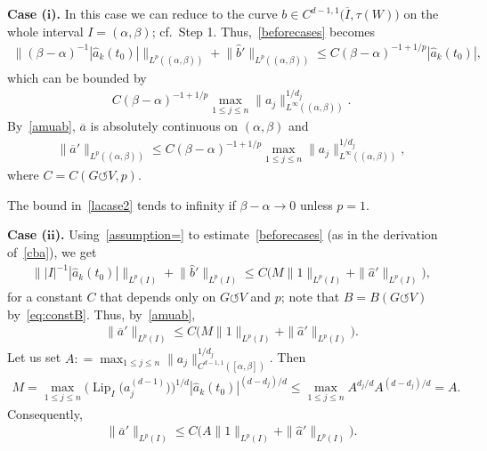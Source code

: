 \documentclass[pdftex]{sigma}
\numberwithin{equation}{section}
\def\al{\alpha}
\def\be{\beta}
\def\ta{\tau}
\def\ol{\overline}
\def\Lip{\on{Lip}}
\def\const{M}
\def\we{\hat}
\def\acts{\circlearrowleft}
\let\on=\operatorname
\begin{document}
\medskip\noindent
{\bf Case ($\boldsymbol i$).}
In this case we can reduce to the curve $b \in C^{d-1,1}\big(\overline I,\ta(W)\big)$ on the whole interval $I=(\al,\be)$; cf.\
Step 1. Thus,~\eqref{beforecases} becomes
\begin{gather*}
 \big\|(\be-\al)^{-1} |\we a_k (t_0)| \big\|_{L^p ((\al,\be))}
 + \big\|\we b'\big\|_{L^p((\al,\be))}
 \le C (\be-\al)^{-1+1/p} |\we a_k(t_0)|,
\end{gather*}
which can be bounded by
\begin{gather*} %
 C (\be-\al)^{-1+1/p} \max_{1 \le j \le n} \| a_j\|^{1/d_j}_{L^\infty((\al,\be))}.
\end{gather*}
By~\eqref{amuab}, $\ol a$ is absolutely continuous on $(\al,\be)$ and
\begin{gather} \label{lacase2}
 \|\ol a'\|_{L^p((\al,\be))} \le C (\be-\al)^{-1+1/p} \max_{1 \le j \le n} \|a_j\|^{1/d_j}_{L^\infty((\al,\be))},
\end{gather}
where $C = C(G \acts V,p)$.

\begin{Remark} %
The bound in~\eqref{lacase2} tends to infinity if $\be - \al \to 0$ unless $p=1$.
\end{Remark}


\medskip\noindent
{\bf Case ($\boldsymbol{ii}$).}
Using~\eqref{assumption=} to estimate~\eqref{beforecases} (as in the derivation of~\eqref{cba}),
we get
\begin{gather*}
 \||I|^{-1} |\we a_k (t_0)| \|_{L^p (I)} + \big\|\we b'\big\|_{L^p(I)}
 \le C \big(\const\|1\|_{L^p(I)} + \|\we a'\|_{L^p (I)}\big), %
\end{gather*}
for a constant $C$ that depends only on $G \acts V$ and $p$; note that $B=B(G \acts V)$ by~\eqref{eq:constB}.
Thus, by~\eqref{amuab},
\begin{gather*}
 \|\ol a'\|_{L^p(I)} \le C \big(\const \|1\|_{L^p(I)} + \|\we a'\|_{L^p (I)}\big).
\end{gather*}
Let us set $A : = \max_{1 \le j \le n} \| a_j\|^{1/d_j}_{C^{d-1,1}([\al,\be])}$. Then
\begin{gather*}
 \const = \max_{1 \le j\le n} \big(\Lip_I\big(a_j^{(d-1)}\big)\big)^{1/d} |\we a_k (t_0)|^{(d-d_j)/d}
 \le \max_{1 \le j\le n} A^{d_j/d} A^{(d-d_j)/d} = A.
\end{gather*}
Consequently,
\begin{gather} \label{eq:laIA}
 \|\ol a'\|_{L^p(I)} \le C \big(A \|1\|_{L^p(I)} + \|\we a'\|_{L^p (I)}\big).
\end{gather}
\end{document}
